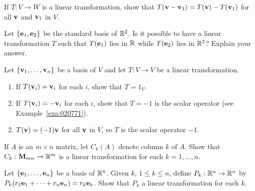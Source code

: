 \begin{multicols}{2}
\begin{ex}
\begin{sol}
\begin{enumerate}[label={\alph*.}]
\end{enumerate}
\end{sol}
\end{ex}

\begin{ex}
If $T : V \to W$ is a linear transformation, show that $T(\textbf{v} - \textbf{v}_{1}) = T(\textbf{v}) - T(\textbf{v}_{1})$ for all $\textbf{v}$ and $\textbf{v}_{1}$ in $V$.
\end{ex}

\begin{ex}
Let $\{\textbf{e}_{1}, \textbf{e}_{2}\}$ be the standard basis of $\mathbb{R}^2$. Is it possible to have a linear transformation $T$ such that $T(\textbf{e}_{1})$ lies in $\mathbb{R}$ while $T(\textbf{e}_{2})$ lies in $\mathbb{R}^2$? Explain your answer.
\end{ex}

\newpage
\begin{ex}
Let $\{\textbf{v}_{1}, \dots, \textbf{v}_{n}\}$ be a basis of $V$ and let $T : V \to V$ be a linear transformation.


\begin{enumerate}[label={\alph*.}]
\item If $T(\textbf{v}_{i}) = \textbf{v}_{i}$ for each $i$, show that $T = 1_{V}$.

\item If $T(\textbf{v}_{i}) = -\textbf{v}_{i}$ for each $i$, show that $T = -1$ is the scalar operator (see Example~\ref{exa:020771}).

\end{enumerate}
\begin{sol}
\begin{enumerate}[label={\alph*.}]
\setcounter{enumi}{1}
\item $T(\textbf{v}) = (-1)\textbf{v}$ for all $\textbf{v}$ in $V$, so $T$ is the scalar operator $-1$.

\end{enumerate}
\end{sol}
\end{ex}

\begin{ex}
If $A$ is an $m \times n$ matrix, let $C_{k}(A)$ denote column $k$ of $A$. Show that $C_{k} : \textbf{M}_{mn} \to \mathbb{R}^m$ is a linear transformation for each $k = 1, \dots, n$.
\end{ex}

\begin{ex}
Let $\{\textbf{e}_{1}, \dots, \textbf{e}_{n}\}$ be a basis of $\mathbb{R}^n$. Given $k$, $1 \leq k \leq n$, define $P_{k} : \mathbb{R}^n \to \mathbb{R}^n$ by \\ $P_{k}(r_{1}\textbf{e}_{1} + \cdots + r_{n}\textbf{e}_{n}) = r_{k}\textbf{e}_{k}$. Show that $P_{k}$ a linear transformation for each $k$.
\end{ex}


\end{multicols}
